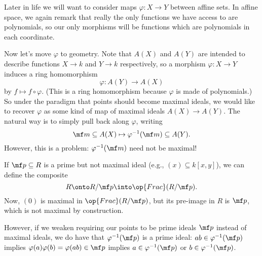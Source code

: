 Later in life we will want to consider maps $\varphi:X\to Y$ between affine sets. In affine space, we again remark that really the only functions we have access to are polynomials, so our only morphisms will be functions which are polynomials in each coordinate.

Now let's move $\varphi$ to geometry. Note that $A(X)$ and $A(Y)$ are intended to describe functions $X\to k$ and $Y\to k$ respectively, so a morphism $\varphi:X\to Y$ induces a ring homomorphism
\[\varphi:A(Y)\rightarrow A(X)\]
by $f\mapsto f\circ\varphi$. (This is a ring homomorphism because $\varphi$ is made of polynomials.) So under the paradigm that points should become maximal ideals, we would like to recover $\varphi$ as some kind of map of maximal ideals $A(X)\to A(Y)$. The natural way is to simply pull back along $\varphi$, writing
\[\mf m\subseteq A(X)\mapsto\varphi^{-1}(\mf m)\subseteq A(Y).\]
However, this is a problem: $\varphi^{-1}(\mf m)$ need not be maximal!
\begin{example}
	If $\mf p\subseteq R$ is a prime but not maximal ideal (e.g., $(x)\subseteq k[x,y]$), we can define the composite
	\[R\onto R/\mf p\into\op{Frac}(R/\mf p).\]
	Now, $(0)$ is maximal in $\op{Frac}(R/\mf p)$, but its pre-image in $R$ is $\mf p$, which is not maximal by construction.
\end{example}
However, if we weaken requiring our points to be prime ideals $\mf p$ instead of maximal ideals, we do have that $\varphi^{-1}(\mf p)$ is a prime ideal: $ab\in\varphi^{-1}(\mf p)$ implies $\varphi(a)\varphi(b)=\varphi(ab)\in\mf p$ implies $a\in\varphi^{-1}(\mf p)$ or $b\in\varphi^{-1}(\mf p)$.


